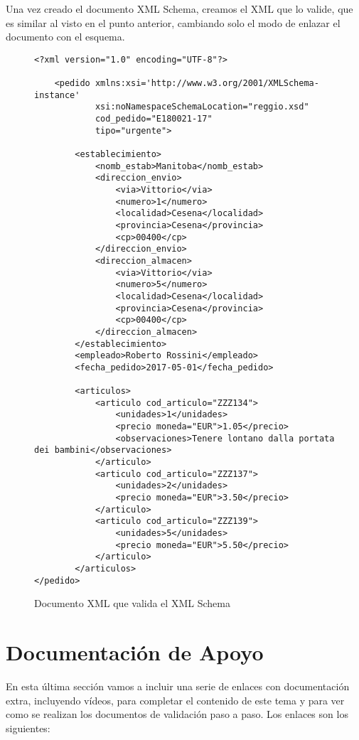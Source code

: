 Una vez creado el documento XML Schema, creamos el XML que lo valide, que es similar al visto en el punto anterior, cambiando solo el modo de enlazar el documento con el esquema.

\begin{figure}[H]
    \begin{tcolorbox}[sharp corners, colback=yellow!30, colframe=white!20]
        \scriptsize
        \begin{verbatim}
<?xml version="1.0" encoding="UTF-8"?>

    <pedido xmlns:xsi='http://www.w3.org/2001/XMLSchema-instance'
            xsi:noNamespaceSchemaLocation="reggio.xsd"
            cod_pedido="E180021-17"
            tipo="urgente">

        <establecimiento>
            <nomb_estab>Manitoba</nomb_estab>
            <direccion_envio>
                <via>Vittorio</via>
                <numero>1</numero>
                <localidad>Cesena</localidad>
                <provincia>Cesena</provincia>
                <cp>00400</cp>
            </direccion_envio>
            <direccion_almacen>
                <via>Vittorio</via>
                <numero>5</numero>
                <localidad>Cesena</localidad>
                <provincia>Cesena</provincia>
                <cp>00400</cp>
            </direccion_almacen>
        </establecimiento>
        <empleado>Roberto Rossini</empleado>
        <fecha_pedido>2017-05-01</fecha_pedido>

        <articulos>
            <articulo cod_articulo="ZZZ134">
                <unidades>1</unidades>
                <precio moneda="EUR">1.05</precio>
                <observaciones>Tenere lontano dalla portata dei bambini</observaciones>
            </articulo>
            <articulo cod_articulo="ZZZ137">
                <unidades>2</unidades>
                <precio moneda="EUR">3.50</precio>
            </articulo>
            <articulo cod_articulo="ZZZ139">
                <unidades>5</unidades>
                <precio moneda="EUR">5.50</precio>
            </articulo>
        </articulos>
</pedido>
        \end{verbatim}
    \end{tcolorbox}
    \caption{Documento XML que valida el XML Schema}
\end{figure}

\section{Documentación de Apoyo}
En esta última sección vamos a incluir una serie de enlaces con documentación extra, incluyendo vídeos, para completar el contenido de este tema y para ver como se realizan los documentos de validación paso a paso. Los enlaces son los siguientes:

